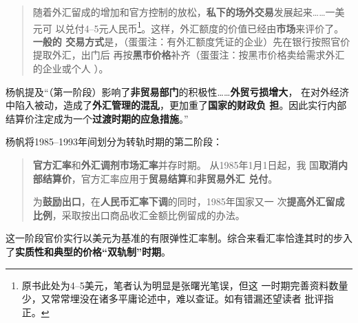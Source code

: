 \begin{quotation}
  随着外汇留成的增加和官方控制的放松，\textbf{私下的场外交易}发展起来……一美元可
  以兑付4--5元人民币\footnote{原书此处为4--5美元，笔者认为明显是张曙光笔误，但这
    一时期完善资料数量少，又常常埋没在诸多平庸论述中，难以查证。如有错漏还望读者
    批评指正。}。这样，外汇额度的价值已经由\textbf{市场}来评价了。\textbf{一般的
    交易方式}是，（蛋蛋注：有外汇额度凭证的企业）先在银行按照官价提取外汇，出门后
  再按\textbf{黑市价格}补齐（蛋蛋注：按黑市价格卖给需求外汇的企业或个人
  ）。
\end{quotation}

杨帆提及“（第一阶段）影响了\textbf{非贸易部门}的积极性……\textbf{外贸亏损增大}，
在对外经济中陷入被动，造成了\textbf{外汇管理的混乱}，更加重了\textbf{国家的财政负
  担}。因此实行内部结算价注定成为一个\textbf{过渡时期的应急措施}。”

杨帆将1985--1993年间划分为转轨时期的第二阶段：
\begin{quotation}
  \textbf{官方汇率}和\textbf{外汇调剂市场汇率}并存时期。 从1985年1月1日起，我
  国\textbf{取消内部结算价}，官方汇率应用于\textbf{贸易结算}和\textbf{非贸易外汇
    兑付}。

  为\textbf{鼓励出口}，在\textbf{人民币汇率下调}的同时，1985年国家又一
  次\textbf{提高外汇留成比例}，采取按出口商品收汇金额比例留成的办法。
\end{quotation}
这一阶段官价实行以美元为基准的有限弹性汇率制。综合来看汇率恰逢其时的步入
了\textbf{实质性和典型的价格“双轨制”时期}。

